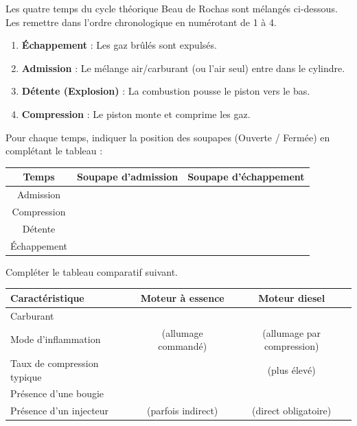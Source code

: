 \documentclass[11pt]{article}
\begin{document}
\begin{exercice}
Les quatre temps du cycle théorique Beau de Rochas sont mélangés ci-dessous. Les remettre dans l'ordre chronologique en numérotant de 1 à 4.
\begin{enumerate}
    \item \textbf{Échappement} : Les gaz brûlés sont expulsés.
    \item \textbf{Admission} : Le mélange air/carburant (ou l'air seul) entre dans le cylindre.
    \item \textbf{Détente (Explosion)} : La combustion pousse le piston vers le bas.
    \item \textbf{Compression} : Le piston monte et comprime les gaz.
\end{enumerate}
Pour chaque temps, indiquer la position des soupapes (Ouverte / Fermée) en complétant le tableau :
\begin{center}
\begin{tabular}{|c|c|c|}
\hline
\textbf{Temps} & \textbf{Soupape d'admission} & \textbf{Soupape d'échappement} \\
\hline
Admission & \dotfill & \dotfill \\
\hline
Compression & \dotfill & \dotfill \\
\hline
Détente & \dotfill & \dotfill \\
\hline
Échappement & \dotfill & \dotfill \\
\hline
\end{tabular}
\end{center}
\end{exercice}

\begin{exercice}
Compléter le tableau comparatif suivant.
\begin{center}
\begin{tabular}{|l|c|c|}
\hline
\textbf{Caractéristique} & \textbf{Moteur à essence} & \textbf{Moteur diesel} \\
\hline
Carburant & \dotfill & \dotfill \\
\hline
Mode d'inflammation & \dotfill (allumage commandé) & \dotfill (allumage par compression) \\
\hline
Taux de compression typique & \dotfill & \dotfill (plus élevé) \\
\hline
Présence d'une bougie & \dotfill & \dotfill \\
\hline
Présence d'un injecteur & \dotfill (parfois indirect) & \dotfill (direct obligatoire) \\
\hline
\end{tabular}
\end{center}
\end{exercice}
\end{document}
